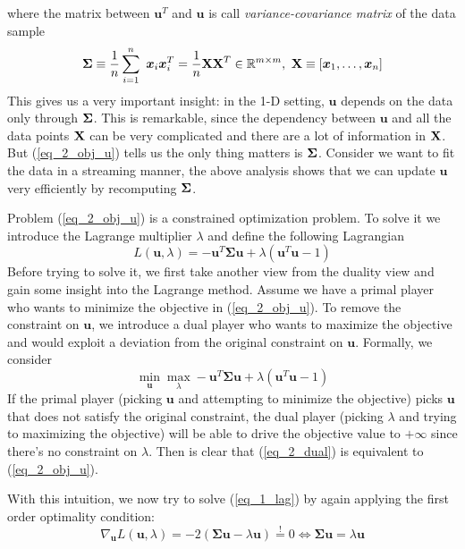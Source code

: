 \documentclass[../book-template.tex]{subfiles}
\begin{document}
where the matrix between $\bm{u}^T$ and $\bm{u}$ is call \emph{variance-covariance matrix} of the data sample
\begin{equation*}
    \bm{\Sigma} \equiv \frac{1}{n}\sum_{i=1}^n\ \bm{x}_i\bm{x}_i^T = \frac{1}{n}{\bf XX}^T \in \mathbb{R}^{m\times m},\ {\bf X}\equiv[\bm{x}_1,\dots,\bm{x}_n]
\end{equation*}
This gives us a very important insight: in the 1-D setting, $\bm{u}$ depends on the data only through ${\bf \Sigma}$. This is remarkable, since the dependency between $\bm{u}$ and all the data points ${\bf X}$ can be very complicated and there are a lot of information in ${\bf X}$. But (\ref{eq_2_obj_u}) tells us the only thing matters is ${\bf \Sigma}$. Consider we want to fit the data in a streaming manner, the above analysis shows that we can update $\bm{u}$ very efficiently by recomputing ${\bf \Sigma}$.
\par Problem (\ref{eq_2_obj_u}) is a constrained optimization problem. To solve it we introduce the Lagrange multiplier $\lambda$ and define the following Lagrangian
\begin{equation}\label{eq_1_lag}
    L(\bm{u},\lambda) = -\bm{u}^T\bm{\Sigma u} + \lambda (\bm{u}^T\bm{u}-1)
\end{equation}
Before trying to solve it, we first take another view from the duality view and gain some insight into the Lagrange method. Assume we have a primal player who wants to minimize the objective in (\ref{eq_2_obj_u}). To remove the constraint on $\bm{u}$, we introduce a dual player who wants to maximize the objective and would exploit a deviation from the original constraint on $\bm{u}$. Formally, we consider
\begin{equation}\label{eq_2_dual}
    \min_{\bm{u}}\max_{\lambda} -\bm{u}^T\bm{\Sigma u} + \lambda (\bm{u}^T\bm{u}-1)
\end{equation}
If the primal player (picking $\bm{u}$ and attempting to minimize the objective) picks $\bm{u}$ that does not satisfy the original constraint, the dual player (picking $\lambda$ and trying to maximizing the objective) will be able to drive the objective value to $+\infty$ since there's no constraint on $\lambda$. Then is clear that (\ref{eq_2_dual}) is equivalent to (\ref{eq_2_obj_u}).
\par With this intuition, we now try to solve (\ref{eq_1_lag}) by again applying the first order optimality condition:
\begin{equation*}
    \nabla_{\bm{u}} L(\bm{u},\lambda) = -2(\bm{\Sigma u}-\lambda \bm{u})\overset{!}{=}0 \Longleftrightarrow \bm{\Sigma u}=\lambda \bm{u}
\end{equation*}
\end{document}
